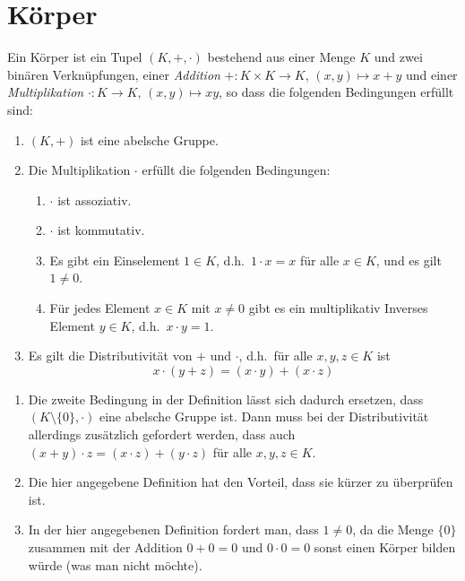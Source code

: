 \section{Körper}


\begin{defi}
 Ein Körper ist ein Tupel $(K, +, \cdot)$ bestehend aus einer Menge $K$ und zwei binären Verknüpfungen, einer \emph{Addition} $+ \colon K \times K \to K$, $(x,y) \mapsto x + y$ und einer \emph{Multiplikation} $\cdot \colon K \to K$, $(x,y) \mapsto xy$, so dass die folgenden Bedingungen erfüllt sind:
 \begin{enumerate}[label=\roman*)]
  \item
   $(K,+)$ ist eine abelsche Gruppe.
  \item
   Die Multiplikation $\cdot$ erfüllt die folgenden Bedingungen:
   \begin{enumerate}[label=\alph*)]
    \item
     $\cdot$ ist assoziativ.
    \item
     $\cdot$ ist kommutativ.
    \item
     Es gibt ein Einselement $1 \in K$, d.h.\ $1 \cdot x = x$ für alle $x \in K$, und es gilt $1 \neq 0$.
    \item
     Für jedes Element $x \in K$ mit $x \neq 0$ gibt es ein multiplikativ Inverses Element $y \in K$, d.h.\ $x \cdot y = 1$.
   \end{enumerate}
  \item
   Es gilt die Distributivität von $+$ und $\cdot$, d.h.\ für alle $x,y,z \in K$ ist
   \[
    x \cdot (y + z)
    = (x \cdot y) + (x \cdot z)
   \]
 \end{enumerate}
\end{defi}


\begin{bem}
 \begin{enumerate}[leftmargin=*]
  \item
   Die zweite Bedingung in der Definition lässt sich dadurch ersetzen, dass $(K\setminus\{0\},\cdot)$ eine abelsche Gruppe ist. Dann muss bei der Distributivität allerdings zusätzlich gefordert werden, dass auch $(x+y) \cdot z = (x \cdot z) + (y \cdot z)$ für alle $x,y,z \in K$.
  \item
   Die hier angegebene Definition hat den Vorteil, dass sie kürzer zu überprüfen ist.
  \item
   In der hier angegebenen Definition fordert man, dass $1 \neq 0$, da die Menge $\{0\}$ zusammen mit der Addition $0 + 0 = 0$ und $0 \cdot 0 = 0$ sonst einen Körper bilden würde (was man nicht möchte).
 \end{enumerate}
\end{bem}


